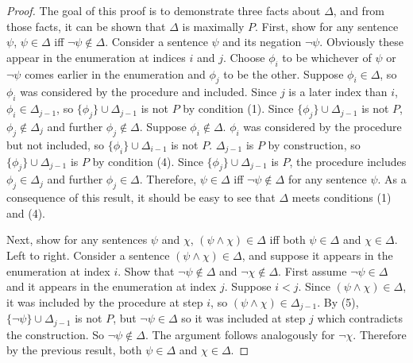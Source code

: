 \documentclass[12pt]{article}
\theoremstyle{definition}
\theoremstyle{remark}
\begin{document}
\begin{proof}
	The goal of this proof is to demonstrate three facts about $\Delta$, and from those facts, it can be shown that $\Delta$ is maximally $P$. First, show for any sentence $\psi$, $\psi \in \Delta$ iff $\neg\psi \not\in \Delta$. Consider a sentence $\psi$ and its negation $\neg\psi$. Obviously these appear in the enumeration at indices $i$ and $j$. Choose $\phi_i$ to be whichever of $\psi$ or $\neg\psi$ comes earlier in the enumeration and $\phi_j$ to be the other. Suppose $\phi_i \in \Delta$, so $\phi_i$ was considered by the procedure and included. Since $j$ is a later index than $i$, $\phi_i \in \Delta_{j-1}$, so $\{ \phi_j \} \cup \Delta_{j-1}$ is not $P$ by condition (1). Since $\{ \phi_j \} \cup \Delta_{j-1}$ is not $P$, $\phi_j \not\in \Delta_j$ and further $\phi_j \not\in \Delta$. Suppose $\phi_i \not\in \Delta$. $\phi_i$ was considered by the procedure but not included, so $\{ \phi_i \} \cup \Delta_{i-1}$ is not $P$. $\Delta_{j-1}$ is $P$ by construction, so $\{ \phi_j \} \cup \Delta_{j-1}$ is $P$ by condition (4). Since $\{ \phi_j \} \cup \Delta_{j-1}$ is $P$, the procedure includes $\phi_j \in \Delta_j$ and further $\phi_j \in \Delta$. Therefore, $\psi \in \Delta$ iff $\neg\psi \not\in \Delta$ for any sentence $\psi$. As a consequence of this result, it should be easy to see that $\Delta$ meets conditions (1) and (4). 
	
	Next, show for any sentences $\psi$ and $\chi$, $(\psi \land \chi) \in \Delta$ iff both $\psi \in \Delta$ and $\chi \in \Delta$. Left to right. Consider a sentence $(\psi \land \chi) \in \Delta$, and suppose it appears in the enumeration at index $i$. Show that $\neg\psi \not\in \Delta$ and $\neg\chi \not\in \Delta$. First assume $\neg\psi \in \Delta$ and it appears in the enumeration at index $j$. Suppose $i < j$. Since $(\psi \land \chi) \in \Delta$, it was included by the procedure at step $i$, so $(\psi \land \chi) \in \Delta_{j-1}$. By (5), $\{ \neg\psi \} \cup \Delta_{j-1}$ is not $P$, but $\neg\psi \in \Delta$ so it was included at step $j$ which contradicts the construction. So $\neg\psi \not\in \Delta$. The argument follows analogously for $\neg\chi$. Therefore by the previous result, both $\psi \in \Delta$ and $\chi \in \Delta$.
	

\end{proof}
\end{document}
